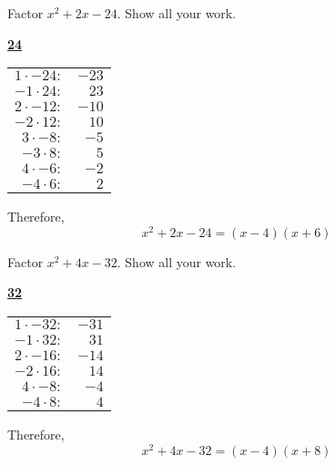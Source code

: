 \documentclass[11pt,letterpaper]{article}
\begin{document}

 Factor $x^2 + 2x - 24$. Show all your work. \pspace

\sol 
	\begin{table}[!ht]
	\centering
	\underline{\bfseries 24} \pvspace{0.2cm}
	\begin{tabular}{rr}
	$1 \cdot -24 \colon$ & $-23$ \\
	$-1 \cdot 24 \colon$ & $23$ \\
	$2 \cdot -12 \colon$ & $-10$ \\
	$-2 \cdot 12 \colon$ & $10$ \\
	$3 \cdot -8 \colon$ & $-5$ \\
	$-3 \cdot 8 \colon$ & $5$ \\
	$4 \cdot -6 \colon$ & $-2$ \\ \hline
	\multicolumn{1}{|r}{$-4 \cdot 6 \colon$} & \multicolumn{1}{r|}{$2$} \\ \hline
	\end{tabular}
	\end{table}

Therefore,
	\[
	x^2 + 2x - 24= (x - 4)(x + 6)
	\]





\newpage





 Factor $x^2 + 4x - 32$. Show all your work. \pspace

\sol 
	\begin{table}[!ht]
	\centering
	\underline{\bfseries 32} \pvspace{0.2cm}
	\begin{tabular}{rr}
	$1 \cdot -32 \colon$ & $-31$ \\
	$-1 \cdot 32 \colon$ & $31$ \\
	$2 \cdot -16 \colon$ & $-14$ \\
	$-2 \cdot 16 \colon$ & $14$ \\
	$4 \cdot -8 \colon$ & $-4$ \\ \hline
	\multicolumn{1}{|r}{$-4 \cdot 8 \colon$} & \multicolumn{1}{r|}{$4$} \\ \hline
	\end{tabular}
	\end{table}

Therefore,
	\[
	x^2 + 4x - 32= (x - 4)(x + 8)
	\]
\end{document}
